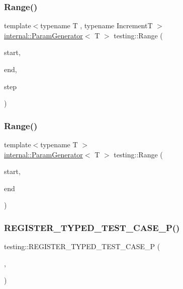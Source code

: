 \mbox{\label{namespacetesting_a4f2c9978ad0c764f57e0cbd6f72cb540}} 
\subsubsection{\texorpdfstring{Range()}{Range()}\hspace{0.1cm}{\footnotesize\ttfamily [1/2]}}
{\footnotesize\ttfamily template$<$typename T , typename IncrementT $>$ \\
\mbox{\hyperlink{classtesting_1_1internal_1_1_param_generator}{internal\+::\+Param\+Generator}}$<$ T $>$ testing\+::\+Range (\begin{DoxyParamCaption}\item[{T}]{start,  }\item[{T}]{end,  }\item[{IncrementT}]{step }\end{DoxyParamCaption})}

\mbox{\label{namespacetesting_a9422b51662c54e62609fadcee050595c}} 
\subsubsection{\texorpdfstring{Range()}{Range()}\hspace{0.1cm}{\footnotesize\ttfamily [2/2]}}
{\footnotesize\ttfamily template$<$typename T $>$ \\
\mbox{\hyperlink{classtesting_1_1internal_1_1_param_generator}{internal\+::\+Param\+Generator}}$<$ T $>$ testing\+::\+Range (\begin{DoxyParamCaption}\item[{T}]{start,  }\item[{T}]{end }\end{DoxyParamCaption})}

\mbox{\label{namespacetesting_a9fc96ebb1c0e7db169c4a5697c903f56}} 
\subsubsection{\texorpdfstring{REGISTER\_TYPED\_TEST\_CASE\_P()}{REGISTER\_TYPED\_TEST\_CASE\_P()}}
{\footnotesize\ttfamily testing\+::\+R\+E\+G\+I\+S\+T\+E\+R\+\_\+\+T\+Y\+P\+E\+D\+\_\+\+T\+E\+S\+T\+\_\+\+C\+A\+S\+E\+\_\+P (\begin{DoxyParamCaption}\item[{\mbox{\hyperlink{classtesting_1_1_code_location_for_t_y_p_e_d_t_e_s_t_p}{Code\+Location\+For\+T\+Y\+P\+E\+D\+T\+E\+S\+TP}}}]{,  }\item[{Verify}]{ }\end{DoxyParamCaption})}

